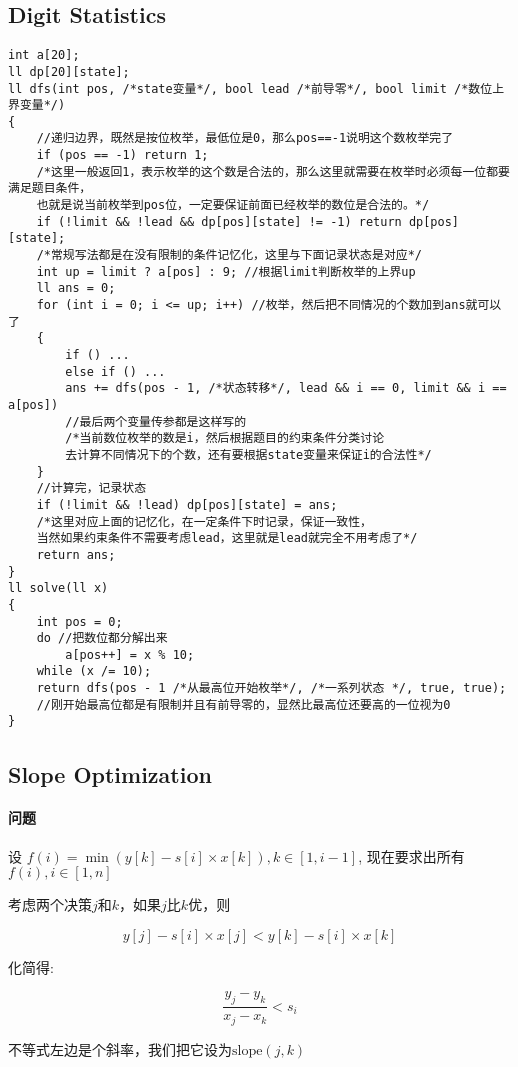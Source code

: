 \documentclass[twoside]{article}
\begin{document}
\subsection{Digit Statistics}
\begin{lstlisting}
int a[20];
ll dp[20][state];
ll dfs(int pos, /*state变量*/, bool lead /*前导零*/, bool limit /*数位上界变量*/)
{
    //递归边界，既然是按位枚举，最低位是0，那么pos==-1说明这个数枚举完了
    if (pos == -1) return 1;
    /*这里一般返回1，表示枚举的这个数是合法的，那么这里就需要在枚举时必须每一位都要满足题目条件，
    也就是说当前枚举到pos位，一定要保证前面已经枚举的数位是合法的。*/
    if (!limit && !lead && dp[pos][state] != -1) return dp[pos][state];
    /*常规写法都是在没有限制的条件记忆化，这里与下面记录状态是对应*/
    int up = limit ? a[pos] : 9; //根据limit判断枚举的上界up
    ll ans = 0;
    for (int i = 0; i <= up; i++) //枚举，然后把不同情况的个数加到ans就可以了
    {
        if () ...
        else if () ...
        ans += dfs(pos - 1, /*状态转移*/, lead && i == 0, limit && i == a[pos])
        //最后两个变量传参都是这样写的
        /*当前数位枚举的数是i，然后根据题目的约束条件分类讨论
        去计算不同情况下的个数，还有要根据state变量来保证i的合法性*/
    }
    //计算完，记录状态
    if (!limit && !lead) dp[pos][state] = ans;
    /*这里对应上面的记忆化，在一定条件下时记录，保证一致性，
    当然如果约束条件不需要考虑lead，这里就是lead就完全不用考虑了*/
    return ans;
}
ll solve(ll x)
{
    int pos = 0;
    do //把数位都分解出来
        a[pos++] = x % 10;
    while (x /= 10);
    return dfs(pos - 1 /*从最高位开始枚举*/, /*一系列状态 */, true, true);
    //刚开始最高位都是有限制并且有前导零的，显然比最高位还要高的一位视为0
}
\end{lstlisting}
\subsection{Slope Optimization}
\paragraph{问题}
设 $f(i) = \min(y[k] - s[i] \times x[k]), k \in [1,i-1]$, 现在要求出所有$f(i), i \in [1,n]$

考虑两个决策$j$和$k$，如果$j$比$k$优，则

$$y[j] - s[i] \times x[j] < y[k] - s[i] \times x[k]$$

化简得:

$$\frac{y_j - y_k}{x_j - x_k} < s_i$$

不等式左边是个斜率，我们把它设为$\text{slope}(j,k)$
\end{document}
